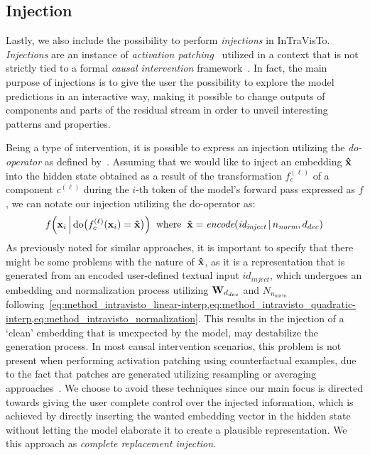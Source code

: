 \subsection{Injection}\label{ssec:method_intravisto_injection}

Lastly, we also include the possibility to perform \emph{injections} in InTraVisTo.
\emph{Injections} are an instance of \emph{activation patching}~\cite{olsson2022,meng2022,hanna2023,conmy2023,wang2023,mohebbi2023,zhang2024} utilized in a context that is not strictly tied to a formal \emph{causal intervention} framework~\cite{geiger2021,mcgrath2023}.
In fact, the main purpose of injections is to give the user the possibility to explore the model predictions in an interactive way, making it possible to change outputs of components and parts of the residual stream in order to unveil interesting patterns and properties.

Being a type of intervention, it is possible to express an injection utilizing the \emph{do-operator} as defined by~\citet{pearl2009}.
Assuming that we would like to inject an embedding $\bm{\mathbf{\hat x}}$ into the hidden state obtained as a result of the transformation $f_c^{(\ell)}$ of a component $c^{(\ell)}$ during the $i$-th token of the model's forward pass expressed as $f$, we can notate our injection utilizing the do-operator as:
\begin{equation}
    \label{eq:method_intravisto_inj_complete}
    f\Bigl(\bm{\mathbf{x}}_i \, \Big| \, \text{do}\bigl(f_c^{(\ell)}(\bm{\mathbf{x}}_i) = \bm{\mathbf{\hat x}}\bigr)\Bigr)
    \;\; \text{where} \;\; \bm{\mathbf{\hat x}} = \textit{encode}(\textit{id}_{\textit{inject}} \,|\, n_\textit{norm}, d_{dec})
\end{equation}
As previously noted for similar approaches, it is important to specify that there might be some problems with the nature of $\bm{\mathbf{\hat x}}$, as it is a representation that is generated from an encoded user-defined textual input ${id}_{\textit{inject}}$, which undergoes an embedding and normalization process utilizing $\bm{\mathbf{W}}_{d_{dec}}$ and $N_{n_\textit{norm}}$ following~\cref{eq:method_intravisto_linear-interp,eq:method_intravisto_quadratic-interp,eq:method_intravisto_normalization}.
This results in the injection of a `clean' embedding that is unexpected by the model,  may destabilize the generation process.
In most causal intervention scenarios, this problem is not present when performing activation patching using counterfactual examples, due to the fact that patches are generated utilizing resampling or averaging approaches~\cite{hanna2023,conmy2023,wang2023}.
We choose to avoid these techniques since our main focus is directed towards giving the user complete control over the injected information, which is achieved by directly inserting the wanted embedding vector in the hidden state without letting the model elaborate it to create a plausible representation.
We  this approach as \emph{complete replacement injection}.

